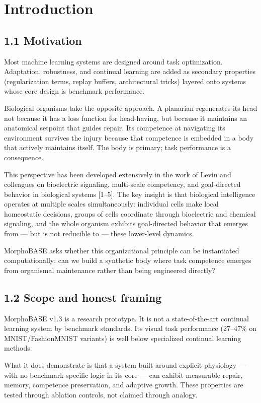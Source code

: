 \documentclass[11pt,a4paper]{article}
\begin{document}
\section{Introduction}

\subsection{1.1 Motivation}
Most machine learning systems are designed around task optimization. Adaptation, robustness, and continual learning are added as secondary properties (regularization terms, replay buffers, architectural tricks) layered onto systems whose core design is benchmark performance.

Biological organisms take the opposite approach. A planarian regenerates its head not because it has a loss function for head-having, but because it maintains an anatomical setpoint that guides repair. Its competence at navigating its environment survives the injury because that competence is embedded in a body that actively maintains itself. The body is primary; task performance is a consequence.

This perspective has been developed extensively in the work of Levin and colleagues on bioelectric signaling, multi-scale competency, and goal-directed behavior in biological systems [1--5]. The key insight is that biological intelligence operates at multiple scales simultaneously: individual cells make local homeostatic decisions, groups of cells coordinate through bioelectric and chemical signaling, and the whole organism exhibits goal-directed behavior that emerges from --- but is not reducible to --- these lower-level dynamics.

MorphoBASE asks whether this organizational principle can be instantiated computationally: can we build a synthetic body where task competence emerges from organismal maintenance rather than being engineered directly?

\subsection{1.2 Scope and honest framing}
MorphoBASE v1.3 is a research prototype. It is not a state-of-the-art continual learning system by benchmark standards. Its visual task performance (27--47\% on MNIST/FashionMNIST variants) is well below specialized continual learning methods.

What it does demonstrate is that a system built around explicit physiology --- with no benchmark-specific logic in its core --- can exhibit measurable repair, memory, competence preservation, and adaptive growth. These properties are tested through ablation controls, not claimed through analogy.
\end{document}
